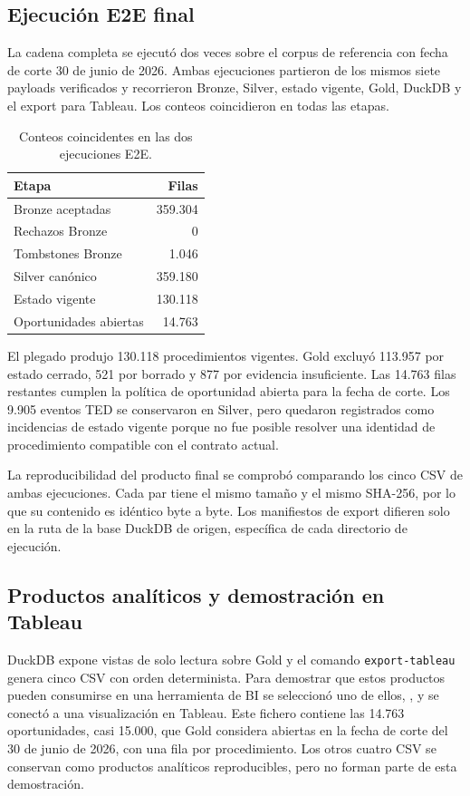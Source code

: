\documentclass[11pt,a4paper]{article}
\newcommand{\cabecera}[1]{{\bfseries #1}}
\begin{document}
\subsection{Ejecución E2E final}

La cadena completa se ejecutó dos veces sobre el corpus de referencia con fecha
de corte 30 de junio de 2026. Ambas ejecuciones partieron de los mismos siete
payloads verificados y recorrieron Bronze, Silver, estado vigente, Gold,
DuckDB y el export para Tableau. Los conteos coincidieron en todas las etapas.

\begin{table}[H]
\centering
\small
\begin{tabularx}{0.72\textwidth}{@{}X r@{}}
\toprule
\cabecera{Etapa} & \cabecera{Filas}\\
\midrule
Bronze aceptadas & 359.304\\
Rechazos Bronze & 0\\
Tombstones Bronze & 1.046\\
Silver canónico & 359.180\\
Estado vigente & 130.118\\
Oportunidades abiertas & 14.763\\
\bottomrule
\end{tabularx}
\caption{Conteos coincidentes en las dos ejecuciones E2E.}
\end{table}

El plegado produjo 130.118 procedimientos vigentes. Gold excluyó 113.957 por
estado cerrado, 521 por borrado y 877 por evidencia insuficiente. Las 14.763
filas restantes cumplen la política de oportunidad abierta para la fecha de
corte. Los 9.905 eventos TED se conservaron en Silver, pero quedaron registrados
como incidencias de estado vigente porque no fue posible resolver una identidad
de procedimiento compatible con el contrato actual.

La reproducibilidad del producto final se comprobó comparando los cinco CSV de
ambas ejecuciones. Cada par tiene el mismo tamaño y el mismo SHA-256, por lo que
su contenido es idéntico byte a byte. Los manifiestos de export difieren solo
en la ruta de la base DuckDB de origen, específica de cada directorio de
ejecución.

\subsection{Productos analíticos y demostración en Tableau}

DuckDB expone vistas de solo lectura sobre Gold y el comando
\texttt{export-tableau} genera cinco CSV con orden determinista. Para demostrar
que estos productos pueden consumirse en una herramienta de BI se seleccionó
uno de ellos, , y se conectó a una visualización
en Tableau. Este fichero contiene las 14.763 oportunidades, casi 15.000, que
Gold considera abiertas en la fecha de corte del 30 de junio de 2026, con una
fila por procedimiento. Los otros cuatro CSV se conservan como productos
analíticos reproducibles, pero no forman parte de esta demostración.
\end{document}
